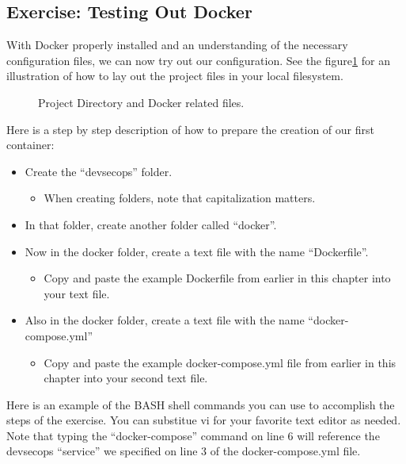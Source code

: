 \subsection{Exercise: Testing Out Docker}
\justify{}
With Docker properly installed and an understanding of the necessary
configuration files, we can now try out our configuration. See the 
figure\ref{githubdirectory} for an illustration of how to lay out the
project files in your local filesystem.

\begin{figure}[!htb]
  \centering
  
  \caption{Project Directory and Docker related files.}
\label{githubdirectory}
\end{figure}

\clearpage
\justify{}
Here is a step by step description of how to prepare the creation of
our first container:

\begin{itemize}
  \item Create the ``devsecops'' folder.
        \begin{itemize}
          \item When creating folders, note that capitalization matters.
        \end{itemize}
  \item In that folder, create another folder called ``docker''.
  \item Now in the docker folder, create a text file with the name ``Dockerfile''.
        \begin{itemize}
          \item
                Copy and paste the example Dockerfile from earlier in this chapter
                into your text file.
        \end{itemize}
  \item Also in the docker folder, create a text file with the name ``docker-compose.yml''
        \begin{itemize}
          \item Copy and paste the example docker-compose.yml file from earlier
          in this chapter into your second text file.
        \end{itemize}
\end{itemize}

\justify{}
Here is an example of the BASH shell commands you can use to accomplish
the steps of the exercise. You can substitue vi for your favorite text
editor as needed. Note that typing the ``docker-compose'' command on line
6 will reference the devsecops ``service'' we specified on line 3 of the
docker-compose.yml file.

